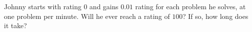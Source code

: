 Johnny starts with rating $0$ and gains $0.01$ rating for each problem he solves, at one problem per minute. Will he ever reach a rating of $100$? If so, how long does it take?
